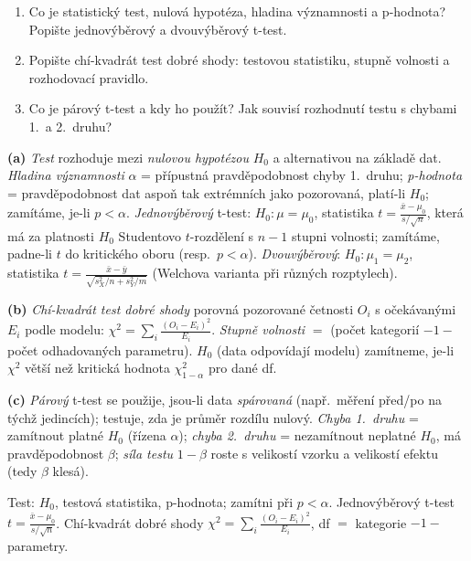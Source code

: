 \begin{zadani}
\begin{enumerate}[label=(\alph*)]
  \item {} Co je statistický test, nulová hypotéza, hladina významnosti a p-hodnota? Popište jednovýběrový a dvouvýběrový t-test.
  \item {} Popište chí-kvadrát test dobré shody: testovou statistiku, stupně volnosti a rozhodovací pravidlo.
  \item {} Co je párový t-test a kdy ho použít? Jak souvisí rozhodnutí testu s chybami 1.\ a 2.\ druhu?
\end{enumerate}
\end{zadani}

\begin{reseni}
\textbf{(a)} \emph{Test} rozhoduje mezi \emph{nulovou hypotézou} $H_0$ a alternativou na základě dat. \emph{Hladina významnosti} $\alpha$ = přípustná pravděpodobnost chyby 1.\ druhu; \emph{p-hodnota} = pravděpodobnost dat aspoň tak extrémních jako pozorovaná, platí-li $H_0$; zamítáme, je-li $p<\alpha$. \emph{Jednovýběrový} t-test: $H_0:\mu=\mu_0$, statistika $t=\frac{\bar x-\mu_0}{s/\sqrt n}$, která má za platnosti $H_0$ Studentovo $t$-rozdělení s $n-1$ stupni volnosti; zamítáme, padne-li $t$ do kritického oboru (resp.\ $p<\alpha$). \emph{Dvouvýběrový}: $H_0:\mu_1=\mu_2$, statistika $t=\frac{\bar x-\bar y}{\sqrt{s_X^2/n+s_Y^2/m}}$ (Welchova varianta při různých rozptylech).

\textbf{(b)} \emph{Chí-kvadrát test dobré shody} porovná pozorované četnosti $O_i$ s očekávanými $E_i$ podle modelu: $\chi^2=\sum_i\frac{(O_i-E_i)^2}{E_i}$. \emph{Stupně volnosti} $=$ (počet kategorií $-1-$ počet odhadovaných parametru). $H_0$ (data odpovídají modelu) zamítneme, je-li $\chi^2$ větší než kritická hodnota $\chi^2_{1-\alpha}$ pro dané df.

\textbf{(c)} \emph{Párový} t-test se použije, jsou-li data \emph{spárovaná} (např.\ měření před/po na týchž jedincích); testuje, zda je průměr rozdílu nulový. \emph{Chyba 1.\ druhu} = zamítnout platné $H_0$ (řízena $\alpha$); \emph{chyba 2.\ druhu} = nezamítnout neplatné $H_0$, má pravděpodobnost $\beta$; \emph{síla testu} $1-\beta$ roste s velikostí vzorku a velikostí efektu (tedy $\beta$ klesá).
\end{reseni}

\begin{jadro}
Test: $H_0$, testová statistika, p-hodnota; zamítni při $p<\alpha$. Jednovýběrový t-test $t=\frac{\bar x-\mu_0}{s/\sqrt n}$. Chí-kvadrát dobré shody $\chi^2=\sum_i\frac{(O_i-E_i)^2}{E_i}$, df $=$ kategorie $-1-$ parametry.
\end{jadro}


